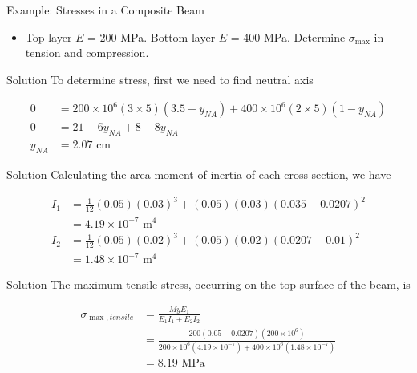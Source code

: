 \documentclass[10pt, svgnames]{beamer}
\begin{document}
\begin{frame}[label={sec:org57d31b5}]{Example: Stresses in a Composite Beam}
\begin{itemize}
\item Top layer \(E\) = 200 MPa. Bottom layer \(E\) = 400 MPa. Determine
\(\sigma_{\max}\) in tension and compression.
\end{itemize}
\end{frame}

\begin{frame}[label={sec:org636d219}]{Solution}
To determine stress, first we need to find neutral axis

\begin{align*}
    0 &= 200 \times {10^6}(3 \times 5)(3.5 - y_{NA}) + 400 \times {10^6}(2 \times 5)(1 - y_{NA}) \\
    0 &= 21 - 6y_{NA} + 8 - 8y_{NA} \\
    y_{NA} &= 2.07 \text{ cm}
\end{align*}
\end{frame}

\begin{frame}[label={sec:org383f46b}]{Solution}
Calculating the area moment of inertia of each cross section, we have

\begin{align*}
    I_1 &= \frac{1}{12}(0.05)(0.03)^3 + (0.05)(0.03)(0.035 - 0.0207)^{2} \\
        &= 4.19 \times 10^{-7} \text{ m}^4 \\
    I_2 &= \frac{1}{12}(0.05)(0.02)^3 + (0.05)(0.02)(0.0207 - 0.01)^{2} \\
        &= 1.48 \times 10^{ -7} \text{ m}^4
\end{align*}
\end{frame}

\begin{frame}[label={sec:orga43620a}]{Solution}
The maximum tensile stress, occurring on the top surface of the
beam, is

\begin{align*}
  \sigma_{\max,tensile} &= \frac{MyE_1}{E_1I_1 + E_2I_2} \\
                             &= \frac{200(0.05 - 0.0207)(200 \times 10^6)}{200 \times 10^6(4.19 \times 10^{-7}) + 400 \times 10^6(1.48 \times 10^{ -7})} \\
                             &= 8.19 \text{ MPa}
\end{align*}
\end{frame}
\end{document}
